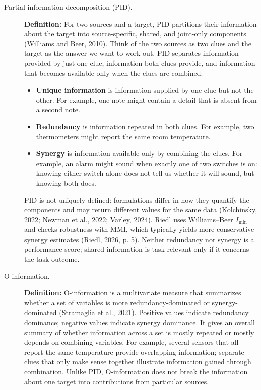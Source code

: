 \documentclass[12pt,a4paper,oneside]{report}
\begin{document}
\begin{description}
\item[Partial information decomposition (PID).]
\textbf{Definition:} For two sources and a target, PID partitions their information about the target into source-specific, shared, and joint-only components (Williams and Beer, 2010).
Think of the two sources as two clues and the target as the answer we want to work out. PID separates information provided by just one clue, information both clues provide, and information that becomes available only when the clues are combined:
\begin{itemize}
\item \textbf{Unique information} is information supplied by one clue but not the other. For example, one note might contain a detail that is absent from a second note.
\item \textbf{Redundancy} is information repeated in both clues. For example, two thermometers might report the same room temperature.
\item \textbf{Synergy} is information available only by combining the clues. For example, an alarm might sound when exactly one of two switches is on: knowing either switch alone does not tell us whether it will sound, but knowing both does.
\end{itemize}
PID is not uniquely defined: formulations differ in how they quantify the components and may return different values for the same data (Kolchinsky, 2022; Newman et al., 2022; Varley, 2024). Riedl uses Williams–Beer \(I_{\min}\) and checks robustness with MMI, which typically yields more conservative synergy estimates (Riedl, 2026, p. 5). Neither redundancy nor synergy is a performance score; shared information is task-relevant only if it concerns the task outcome.

\item[O-information.]
\textbf{Definition:} O-information is a multivariate measure that summarizes whether a set of variables is more redundancy-dominated or synergy-dominated (Stramaglia et al., 2021). Positive values indicate redundancy dominance; negative values indicate synergy dominance.
It gives an overall summary of whether information across a set is mostly repeated or mostly depends on combining variables. For example, several sensors that all report the same temperature provide overlapping information; separate clues that only make sense together illustrate information gained through combination. Unlike PID, O-information does not break the information about one target into contributions from particular sources.


\end{description}
\end{document}
